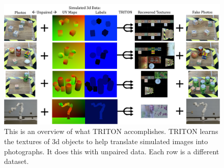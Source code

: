 \documentclass{article}
\begin{document}








\begin{figure}[H]
	\begin{center}
		\includegraphics[width=400pt]{../images/first_diagram.pdf}
	\end{center}
	\caption{
		This is an overview of what TRITON accomplishes.
		TRITON learns the textures of 3d objects to help translate simulated images into photographs. It does this with unpaired data. Each row is a different dataset.
		}
	\label{fig:uvl_explanation}
\end{figure}
\end{document}

